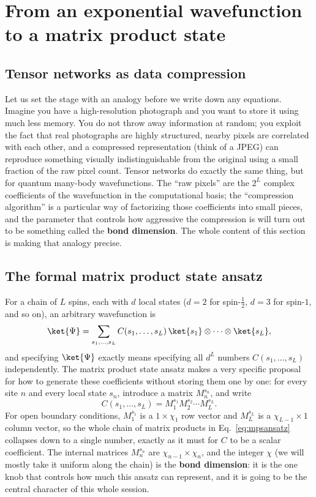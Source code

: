\documentclass[all_sessions.tex]{subfiles}
\begin{document}
\section{From an exponential wavefunction to a matrix product state}

\subsection{Tensor networks as data compression}
Let us set the stage with an analogy before we write down any equations. Imagine you have a
high-resolution photograph and you want to store it using much less memory. You do not throw away
information at random; you exploit the fact that real photographs are highly structured, nearby
pixels are correlated with each other, and a compressed representation (think of a JPEG) can
reproduce something visually indistinguishable from the original using a small fraction of the
raw pixel count. Tensor networks do exactly the same thing, but for quantum many-body
wavefunctions. The ``raw pixels'' are the $2^L$ complex coefficients of the wavefunction in the
computational basis; the ``compression algorithm'' is a particular way of factorizing those
coefficients into small pieces, and the parameter that controls how aggressive the compression is
will turn out to be something called the \textbf{bond dimension}. The whole content of this
section is making that analogy precise.

\subsection{The formal matrix product state ansatz}
For a chain of $L$ spins, each with $d$ local states ($d=2$ for spin-$\tfrac12$, $d=3$ for
spin-$1$, and so on), an arbitrary wavefunction is
\begin{equation}
  \ket{\Psi} = \sum_{s_1,\ldots,s_L} C(s_1,\ldots,s_L)\, \ket{s_1}\otimes\cdots\otimes\ket{s_L},
  \label{eq:generalwf}
\end{equation}
and specifying $\ket{\Psi}$ exactly means specifying all $d^L$ numbers $C(s_1,\ldots,s_L)$
independently. The matrix product state ansatz makes a very specific proposal for how to generate
these coefficients without storing them one by one: for every site $n$ and every local state
$s_n$, introduce a matrix $M_n^{s_n}$, and write
\begin{equation}
  C(s_1,\ldots,s_L) = M_1^{s_1} M_2^{s_2} \cdots M_L^{s_L}.
  \label{eq:mpsansatz}
\end{equation}
For open boundary conditions, $M_1^{s_1}$ is a $1\times\chi_1$ row vector and $M_L^{s_L}$ is a
$\chi_{L-1}\times 1$ column vector, so the whole chain of matrix products in
Eq.~\eqref{eq:mpsansatz} collapses down to a single number, exactly as it must for $C$ to be a
scalar coefficient. The internal matrices $M_n^{s_n}$ are $\chi_{n-1}\times \chi_n$, and the
integer $\chi$ (we will mostly take it uniform along the chain) is the \textbf{bond dimension}: it
is the one knob that controls how much this ansatz can represent, and it is going to be the
central character of this whole session.
\end{document}
